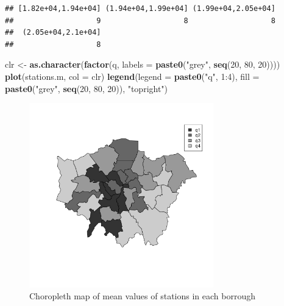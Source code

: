 \documentclass[]{article}
\newenvironment{Shaded}{}{}
\newcommand{\KeywordTok}[1]{\textcolor[rgb]{0.00,0.44,0.13}{\textbf{{#1}}}}
\newcommand{\DataTypeTok}[1]{\textcolor[rgb]{0.56,0.13,0.00}{{#1}}}
\newcommand{\DecValTok}[1]{\textcolor[rgb]{0.25,0.63,0.44}{{#1}}}
\newcommand{\StringTok}[1]{\textcolor[rgb]{0.25,0.44,0.63}{{#1}}}
\newcommand{\NormalTok}[1]{{#1}}
\let\Oldincludegraphics\includegraphics
\renewcommand{\includegraphics}[1]{\Oldincludegraphics[width=8cm]{#1}}
\begin{document}
\begin{Shaded}
\end{Shaded}
\begin{verbatim}
## [1.82e+04,1.94e+04] (1.94e+04,1.99e+04] (1.99e+04,2.05e+04] 
##                   9                   8                   8 
##  (2.05e+04,2.1e+04] 
##                   8
\end{verbatim}
\begin{Shaded}
\begin{Highlighting}[]
\NormalTok{clr <- }\KeywordTok{as.character}\NormalTok{(}\KeywordTok{factor}\NormalTok{(q, }\DataTypeTok{labels =} \KeywordTok{paste0}\NormalTok{(}\StringTok{"grey"}\NormalTok{, }\KeywordTok{seq}\NormalTok{(}\DecValTok{20}\NormalTok{, }\DecValTok{80}\NormalTok{, }\DecValTok{20}\NormalTok{))))}
\KeywordTok{plot}\NormalTok{(stations.m, }\DataTypeTok{col =} \NormalTok{clr)}
\KeywordTok{legend}\NormalTok{(}\DataTypeTok{legend =} \KeywordTok{paste0}\NormalTok{(}\StringTok{"q"}\NormalTok{, }\DecValTok{1}\NormalTok{:}\DecValTok{4}\NormalTok{), }\DataTypeTok{fill =} \KeywordTok{paste0}\NormalTok{(}\StringTok{"grey"}\NormalTok{, }\KeywordTok{seq}\NormalTok{(}\DecValTok{20}\NormalTok{, }\DecValTok{80}\NormalTok{, }\DecValTok{20}\NormalTok{)), }\StringTok{"topright"}\NormalTok{)}
\end{Highlighting}
\end{Shaded}
\begin{figure}[htbp]
\centering
\includegraphics{figure/Choropleth_map_of_mean_values_of_stations_in_each_borrough.png}
\caption{Choropleth map of mean values of stations in each
borrough}
\end{figure}
\end{document}
